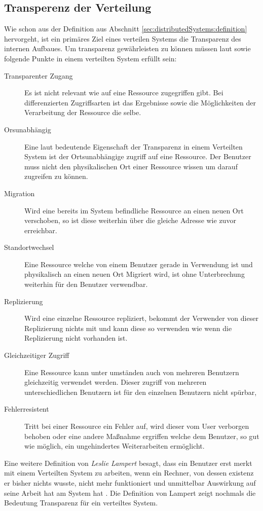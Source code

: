 \subsection{Transperenz der Verteilung}\label{sec:distributedSystems:goales:Transperency} Wie schon aus der Definition aus Abschnitt \ref{sec:distributedSystems:definition} hervorgeht, ist ein primäres Ziel eines verteilen Systems die Transparenz des internen Aufbaues. Um transparenz gewährleisten zu können  müssen laut \cite{iec1995open} sowie \cite{tanenbaum2007distributed} folgende Punkte in einem verteilten System erfüllt sein:
\begin{description}
    \item[Transparenter Zugang] Es ist nicht relevant wie auf eine Ressource zugegriffen gibt. Bei differenzierten Zugriffsarten ist das Ergebnisse sowie die Möglichkeiten der Verarbeitung der Ressource die selbe. 
    \item[Orsunabhängig] Eine laut \cite{tanenbaum2007distributed} bedeutende Eigenschaft der Transparenz in einem Verteilten System ist der Ortsunabhängige zugriff auf eine Ressource. Der Benutzer muss nicht den physikalischen Ort einer Ressource wissen um darauf zugreifen zu können. 
    \item[Migration] Wird eine bereits im System befindliche Ressource an einen neuen Ort verschoben, so ist diese weiterhin über die gleiche Adresse wie zuvor erreichbar.
    \item [Standortwechsel] Eine Ressource welche von einem Benutzer gerade in Verwendung ist und physikalisch an einen neuen Ort Migriert wird, ist ohne Unterbrechung weiterhin für den Benutzer verwendbar.
    \item[Replizierung] Wird eine einzelne Ressource repliziert, bekommt der Verwender von dieser Replizierung nichts mit und kann diese so verwenden wie wenn die Replizierung nicht vorhanden ist. 
    \item[Gleichzeitiger Zugriff] Eine Ressource kann unter umständen auch von mehreren Benutzern gleichzeitig verwendet werden. Dieser zugriff von mehreren unterschiedlichen Benutzern ist für den einzelnen Benutzern nicht spürbar,
    \item[Fehlerresistent] Tritt bei einer Ressource ein Fehler auf, wird dieser vom User verborgen behoben oder eine andere Maßnahme ergriffen welche dem Benutzer, so gut wie möglich, ein ungehindertes Weiterarbeiten ermöglicht.
\end{description}
Eine weitere Definition von \textit{Leslie Lampert} besagt, dass ein Benutzer erst merkt mit einem Verteilten System zu arbeiten, wenn ein Rechner, von dessen existenz er bisher nichts wusste, nicht mehr funktioniert und unmittelbar Auswirkung auf seine Arbeit hat am System hat \citep{Schroeder:1993}. Die Definition von Lampert zeigt nochmals die Bedeutung Transparenz für ein verteiltes System. \\
